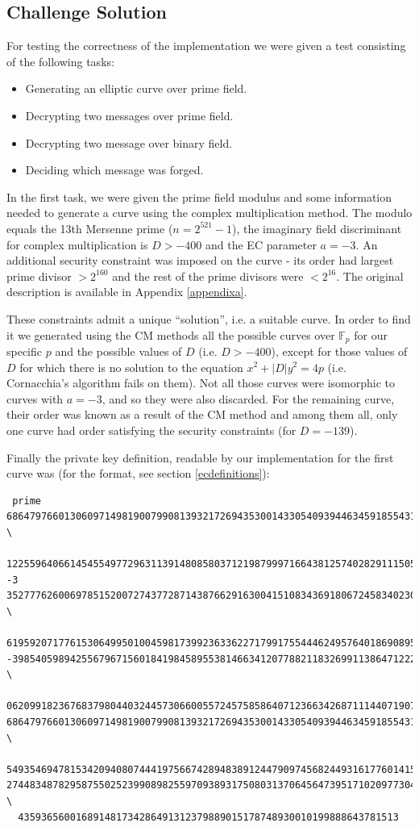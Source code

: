 \documentclass[11pt,english]{article}
\begin{document}
\subsection{Challenge Solution}
For testing the correctness of the implementation we were given a test consisting of the following tasks:

\begin{itemize}
 \item Generating an elliptic curve over prime field.
 \item Decrypting two messages over prime field.
 \item Decrypting two message over binary field.
 \item Deciding which message was forged.
\end{itemize}

In the first task, we were given the prime field modulus and some information needed to generate a curve using the complex multiplication method. The modulo equals the 13th Mersenne prime ($n=2^{521}-1$), the imaginary field discriminant for complex multiplication is $D>-400$ and the EC parameter $a=-3$. 
An additional security constraint was imposed on the curve - its order had largest prime divisor $>2^{160}$ and the rest of the prime divisors were $<2^{16}$. 
The original description is available in Appendix \ref{appendixa}.

These constraints admit a unique ``solution'', i.e. a suitable curve. In order to find it we generated using the CM methods all the possible
curves over $\mathbb{F}_p$ for our specific $p$ and the possible values of $D$ (i.e. $D>-400$), except for those values of
$D$ for which there is no solution to the equation $x^2+|D|y^2=4p$ (i.e. Cornacchia's algorithm fails on them). Not all those curves
were isomorphic to curves with $a=-3$, and so they were also discarded. For the remaining curve, their order was known as a result
of the CM method and among them all, only one curve had order satisfying the security constraints (for $D=-139$).

Finally the private key definition, readable by our implementation for the first curve was (for the format, see section \ref{ecdefinitions}):

\begin{verbatim}
 prime
6864797660130609714981900799081393217269435300143305409394463459185543183397656052 \
  122559640661454554977296311391480858037121987999716643812574028291115057151
-3
3527776260069785152007274377287143876629163004151083436918067245834023095352803352 \
  619592071776153064995010045981739923633622717991755444624957640186908953364
-398540598942556796715601841984589553814663412077882118326991138647122232976515044 \
  0620991823676837980440324457306600557245758586407123663426871114407190797434
6864797660130609714981900799081393217269435300143305409394463459185543183397650992 \
  549354694781534209408074441975667428948389124479097456824493161776014158579
2744834878295875502523990898255970938931750803137064564739517102097730423490652151 \
  435936560016891481734286491312379889015178748930010199888643781513
\end{verbatim}
\end{document}
